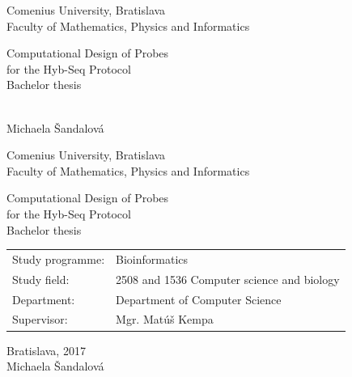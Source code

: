 \documentclass[12pt, oneside]{book}
\def\mfrok{2017}
\def\mfnazov{Computational Design of Probes \\for the Hyb-Seq Protocol}
\def\mftyp{Bachelor thesis}
\def\mfautor{Michaela Šandalová}
\def\mfskolitel{Mgr. Matúš Kempa}
\def\mfkonzultant{TODO}
\def\mfmiesto{Bratislava, \mfrok}
\def\mfodbor{2508 and 1536 Computer science and biology}
\def\program{ Bioinformatics }
\def\mfpracovisko{ Department of Computer Science }
\begin{document}
     
\frontmatter


\thispagestyle{empty}

\begin{center}
\sc\large
Comenius University, Bratislava\\
Faculty of Mathematics, Physics and Informatics

\vfill

{\LARGE\mfnazov}\\
\mftyp
\end{center}

\vfill

{\sc\large 
\noindent \mfrok\\
\mfautor
}

\eject %


\thispagestyle{empty}
\noindent

\begin{center}
\sc  
\large
Comenius University, Bratislava\\
Faculty of Mathematics, Physics and Informatics

\vfill

{\LARGE\mfnazov}\\
\mftyp
\end{center}

\vfill

\noindent
\begin{tabular}{ll}
Study programme: & \program \\
Study field: & \mfodbor \\
Department: & \mfpracovisko \\
Supervisor: & \mfskolitel \\
\end{tabular}

\vfill


\noindent \mfmiesto\\
\mfautor

\eject %




\end{document}
